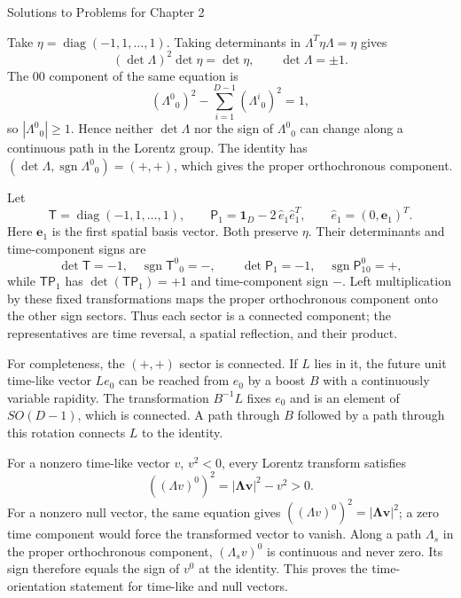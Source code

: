 \begin{bankssolutions}{Solutions to Problems for Chapter 2}

Take $\eta=\operatorname{diag}(-1,1,\ldots,1)$. Taking determinants in
$\Lambda^{T}\eta\Lambda=\eta$ gives
\[
  (\det\Lambda)^{2}\det\eta=\det\eta,
  \qquad \det\Lambda=\pm1.
\]
The $00$ component of the same equation is
\[
  (\Lambda^{0}{}_{0})^{2}-\sum_{i=1}^{D-1}(\Lambda^{i}{}_{0})^{2}=1,
\]
so $|\Lambda^{0}{}_{0}|\geq1$. Hence neither $\det\Lambda$ nor the sign of $\Lambda^{0}{}_{0}$ can change along a continuous path in the Lorentz group. The identity has $(\det\Lambda,\operatorname{sgn}\Lambda^{0}{}_{0})=(+,+)$, which gives the proper orthochronous component.

Let
\[
  \mathsf T=\operatorname{diag}(-1,1,\ldots,1),
  \qquad
  \mathsf P_{1}=\mathbf 1_D-2\,\widehat e_{1}\widehat e_{1}^{T},
  \qquad \widehat e_{1}=(0,\mathbf e_{1})^{T}.
\]
Here $\mathbf e_{1}$ is the first spatial basis vector.
Both preserve $\eta$. Their determinants and time-component signs are
\[
  \det\mathsf T=-1,\quad \operatorname{sgn}\mathsf T^{0}{}_{0}=-,
  \qquad
  \det\mathsf P_{1}=-1,\quad \operatorname{sgn}\mathsf P_{1}^{0}{}_{0}=+,
\]
while $\mathsf T\mathsf P_{1}$ has $\det(\mathsf T\mathsf P_{1})=+1$ and time-component sign $-$. Left multiplication by these fixed transformations maps the proper orthochronous component onto the other sign sectors. Thus each sector is a connected component; the representatives are time reversal, a spatial reflection, and their product.

For completeness, the $(+,+)$ sector is connected. If $L$ lies in it, the future unit time-like vector $Le_{0}$ can be reached from $e_{0}$ by a boost $B$ with a continuously variable rapidity. The transformation $B^{-1}L$ fixes $e_{0}$ and is an element of $SO(D-1)$, which is connected. A path through $B$ followed by a path through this rotation connects $L$ to the identity.

For a nonzero time-like vector $v$, $v^{2}<0$, every Lorentz transform satisfies
\[
  ((\Lambda v)^{0})^{2}=|\boldsymbol{\Lambda v}|^{2}-v^{2}>0.
\]
For a nonzero null vector, the same equation gives $((\Lambda v)^{0})^{2}=|\boldsymbol{\Lambda v}|^{2}$; a zero time component would force the transformed vector to vanish. Along a path $\Lambda_s$ in the proper orthochronous component, $(\Lambda_s v)^{0}$ is continuous and never zero. Its sign therefore equals the sign of $v^{0}$ at the identity. This proves the time-orientation statement for time-like and null vectors.


\end{bankssolutions}

